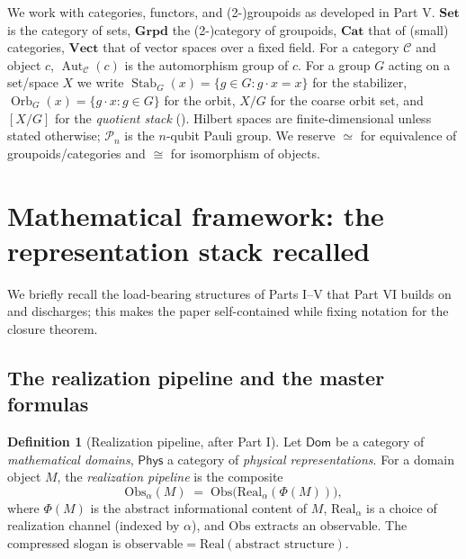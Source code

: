 \documentclass[12pt]{article}
\theoremstyle{definition}
\newtheorem{definition}[theorem]{Definition}
\theoremstyle{remark}
\newcommand{\cat}[1]{\mathcal{#1}}
\newcommand{\Dom}{\mathsf{Dom}}
\newcommand{\Phys}{\mathsf{Phys}}
\newcommand{\Grpd}{\mathbf{Grpd}}
\newcommand{\Set}{\mathbf{Set}}
\newcommand{\Cat}{\mathbf{Cat}}
\newcommand{\Vect}{\mathbf{Vect}}
\newcommand{\Real}{\mathrm{Real}}
\newcommand{\Obs}{\mathrm{Obs}}
\newcommand{\Aut}{\operatorname{Aut}}
\newcommand{\Stab}{\operatorname{Stab}}
\newcommand{\Orb}{\operatorname{Orb}}
\newcommand{\quot}[2]{[#1/#2]}
\newcommand{\Pauli}{\mathcal{P}}
\begin{document}
We work with categories, functors, and (2-)groupoids as developed in Part V. $\Set$ is
the category of sets, $\Grpd$ the (2-)category of groupoids, $\Cat$ that of
(small) categories, $\Vect$ that of vector spaces over a fixed field. For a category
$\cat C$ and object $c$, $\Aut_{\cat C}(c)$ is the automorphism group of $c$. For a
group $G$ acting on a set/space $X$ we write $\Stab_G(x)=\{g\in G: g\cdot x = x\}$ for
the stabilizer, $\Orb_G(x)=\{g\cdot x : g\in G\}$ for the orbit, $X/G$ for the coarse
orbit set, and $\quot{X}{G}$ for the \emph{quotient stack} ().
Hilbert spaces are finite-dimensional unless stated otherwise; $\Pauli_n$ is the
$n$-qubit Pauli group. We reserve $\simeq$ for equivalence of groupoids/categories and
$\cong$ for isomorphism of objects.

\section{Mathematical framework: the representation stack recalled}
\label{sec:framework}

We briefly recall the load-bearing structures of Parts I--V that Part VI builds on and
discharges; this makes the paper self-contained while fixing notation for the closure
theorem.

\subsection{The realization pipeline and the master formulas}

\begin{definition}[Realization pipeline, after Part I]
\label{def:pipeline}
Let $\Dom$ be a category of \emph{mathematical domains}, $\Phys$ a category of
\emph{physical representations}. For a domain object $M$, the \emph{realization
pipeline} is the composite
\begin{equation}
\Obs_\alpha(M)\;=\;\Obs\bigl(\Real_\alpha(\Phi(M))\bigr),
\label{eq:pipeline}
\end{equation}
where $\Phi(M)$ is the abstract informational content of $M$, $\Real_\alpha$ is a
choice of realization channel (indexed by $\alpha$), and $\Obs$ extracts an
observable. The compressed slogan is $\text{observable}=\Real(\text{abstract
structure})$.
\end{definition}
\end{document}
